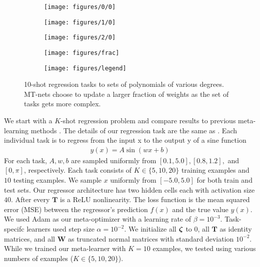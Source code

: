 \documentclass{article}
\newcommand{\bzeta}{\mbox{\boldmath $\zeta$}}
\newcommand{\0}{{\bf 0}}
\newcommand{\W}{\mathbf{W}}
\newcommand{\T}{\mathbf{T}}
\newcommand{\logit}{\bzeta}
\begin{document}
\begin{figure*}[t]
\begin{subfigure}{.5\columnwidth}
  \centering
  \texttt{[image: figures/0/0]}
\end{subfigure}\begin{subfigure}{.5\columnwidth}
  \centering
  \texttt{[image: figures/1/0]}
\end{subfigure}\begin{subfigure}{.5\columnwidth}
  \centering
  \texttt{[image: figures/2/0]}
\end{subfigure}\begin{subfigure}{.5\columnwidth}
  \centering
  \texttt{[image: figures/frac]}
\end{subfigure}

\begin{subfigure}{2\columnwidth}
  \texttt{[image: figures/legend]}
\end{subfigure}\caption{
10-shot regression tasks to sets of polynomials of various degrees.
MT-nets choose to update a larger fraction of weights as the set of tasks gets more complex.
}
\end{figure*}
We start with a $K$-shot regression problem and compare results to previous meta-learning methods \cite{FinnC2017icml, Li2017arxiv}.
The details of our regression task are the same as \cite{Li2017arxiv}.
Each individual task is to regress from the input x to the output y of a sine function
\begin{align}
y(x) = A \sin (wx + b)
\end{align}
For each task, $A,w,b$ are sampled uniformly from $[0.1,5.0], [0.8,1.2],$ and $[0,\pi]$, respectively.
Each task consists of $K \in \{5, 10, 20\}$ training examples and $10$ testing examples.
We sample $x$ uniformly from $[-5.0, 5.0]$ for both train and test sets.
Our regressor architecture has two hidden cells each with activation size $40$.
After every $\T$ is a ReLU nonlinearity.
The loss function is the mean squared error (MSE) between the regressor's prediction $f(x)$ and the true value $y(x)$.
We used Adam \cite{KingmaDP2015iclr} as our meta-optimizer with a learning rate of $\beta=10^{-3}$.
Task-specifc learners used step size $\alpha=10^{-2}$.
We initialize all $\logit$ to $0$, all $\T$ as identity matrices, and all $\W$ as truncated normal matrices with standard deviation $10^{-2}$.
While we trained our meta-learner with $K=10$ examples, we tested using various numbers of examples ($K \in \{5, 10, 20\}$).
\end{document}
